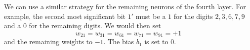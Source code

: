\begin{solution}
We can use a similar strategy for the remaining neurons of the fourth layer. For 
example, the second most significant bit $1'$ must be a $1$ for the digits 
$2, 3, 6, 7, 9$ and a $0$ for the remaining digits. We would then set 
\[ 
w_{2 1} = w_{3 1} = w_{6 1} = w_{7 1} = w_{9 1} = +1 
\]
and the remaining weights to $-1$. The bias $b_1$ is set to $0$. 
\end{solution}

